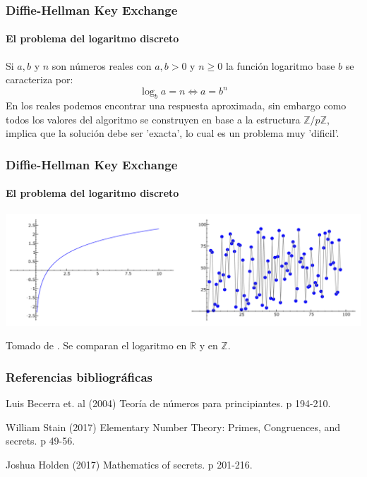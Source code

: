 \documentclass[spanish, mexico]{beamer}
\begin{document}
	\begin{frame}
		\frametitle{Diffie-Hellman Key Exchange}
		\framesubtitle{El problema del logaritmo discreto}
		Si $a, b$ y $n$ son números reales con $a,b>0$ y $n\geq0$ la función logaritmo base $b$ se caracteriza por:
		$$\log_b{a}=n \Longleftrightarrow a = b^n$$
		En los reales podemos encontrar una respuesta aproximada, sin embargo como todos los valores del algoritmo se construyen en base a la estructura $\mathbb{Z}/p\mathbb{Z}$, implica que la solución debe ser 'exacta', lo cual es un problema muy 'dificil'.
	\end{frame}
	
	\begin{frame}
		\frametitle{Diffie-Hellman Key Exchange}
		\framesubtitle{El problema del logaritmo discreto}
		\begin{center}
		    \includegraphics[scale=0.35]{dl.png}
	    \end{center}
	    Tomado de \cite{Stein}. Se comparan el logaritmo en $\mathbb{R}$ y en $\mathbb{Z}$.
	\end{frame}

	\begin{frame}
		\frametitle{Referencias bibliográficas}
		\footnotesize{
		\begin{thebibliography}{1}
			 Luis Becerra et. al (2004)
			\newblock Teoría de números para principiantes.
			\newblock p 194-210.
		\end{thebibliography}
		\begin{thebibliography}{2}
			 William Stain (2017)
			\newblock Elementary Number Theory: Primes, Congruences, and secrets.
			\newblock p 49-56.
		\end{thebibliography}
		\begin{thebibliography}{3}
			 Joshua Holden (2017)
			\newblock Mathematics of secrets.
			\newblock p 201-216.
		\end{thebibliography}	
		}
	\end{frame}
\end{document}
